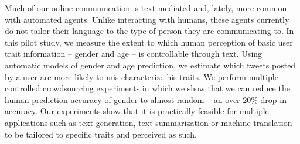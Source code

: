 Much of our online communication is text-mediated and, lately, more common with automated agents. Unlike interacting with humans, these agents currently do not tailor their language to the type of person they are communicating to. In this pilot study, we measure the extent to which human perception of basic user trait information -- gender and age -- is controllable through text. Using automatic models of gender and age prediction, we estimate which tweets posted by a user are more likely to mis-characterize his traits. We perform multiple controlled crowdsourcing experiments in which we show that we can reduce the human prediction accuracy of gender to almost random -- an over 20\% drop in accuracy. Our experiments show that it is practically feasible for multiple applications such as text generation, text summarization or machine translation to be tailored to specific traits and perceived as such.
